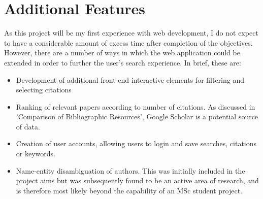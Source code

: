\documentclass[PROP_AGutteridge_CS.tex]{subfiles}
\begin{document}
\section{Additional Features}
As this project will be my first experience with web development, I do not expect to have a considerable amount of excess time after completion of the objectives. However, there are a number of ways in which the web application could be extended in order to further the user's search experience. In brief, these are:
\begin{itemize}
\item{Development of additional front-end interactive elements for filtering and selecting citations}
\item{Ranking of relevant papers according to number of citations. As discussed in 'Comparison of Bibliographic Resources', Google Scholar is a potential source of data.}
\item{Creation of user accounts, allowing users to login and save searches, citations or keywords.}
\item{Name-entity disambiguation of authors. This was initially included in the project aims but was subsequently found to be an active area of research\cite{shin}, and is therefore most likely beyond the capability of an MSc student project.}
\end{itemize}
\end{document}
